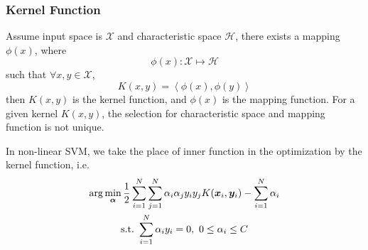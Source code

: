 \documentclass[12pt]{article}
\begin{document}
\subsubsection{Kernel Function}
Assume input space is $\mathcal{X}$ and characteristic space $\mathcal{H}$, there exists a mapping $\phi(x)$, where
\begin{equation}
    \phi(x): \mathcal{X} \mapsto \mathcal{H}
\end{equation}
such that $\forall x, y \in \mathcal{X}$,
\begin{equation}
    K(x,y) = \left\langle \phi(x),\phi(y) \right\rangle
\end{equation}
then $K(x, y)$ is the kernel function, and $\phi(x)$ is the mapping function. For a given kernel $K(x, y)$, the selection for characteristic space and mapping function is not unique. \par
In non-linear SVM, we take the place of inner function in the optimization by the kernel function, i.e.
\begin{gather}
    \arg \min_{\bm{\alpha}} \frac{1}{2}\sum_{i=1}^N \sum_{j=1}^N \alpha_i \alpha_j y_i y_j K(\bm{x}_i,\bm{y}_i) - \sum_{i=1}^N \alpha_i  \notag \\ \text{s.t.}~\sum_{i=1}^N \alpha_i y_i = 0,~0 \leq \alpha_i \leq C
\end{gather}
\end{document}
